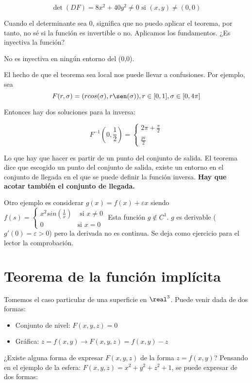 $$\det(DF) = 8x^2 + 40y^2 \neq 0 \text{ si } (x,y) \neq (0,0)$$

Cuando el determinante sea 0, significa que no puedo aplicar el teorema, por tanto, no sé si la función es invertible o no. Aplicamos los fundamentos. ¿Es inyectiva la función?

No es inyectiva en ningún entorno del (0,0).

El hecho de que el teorema sea local nos puede llevar a confusiones. Por ejemplo, sea \[ F (r,\sigma) = (rcos(\sigma),r\sen(\sigma)), r \in [0,1], \sigma \in [0,4\pi]\]

Entonces hay dos soluciones para la inversa:

\[ F^{-1} (0,\frac{1}{2}) = \left\{\begin{matrix}2\pi+\frac{\pi}{2}\\\frac{pi}{2}\end{matrix}\right. \]

Lo que hay que hacer es partir de un punto del conjunto de salida. El teorema dice que escogido un punto del conjunto de salida, existe un entorno en el conjunto de llegada en el que se puede definir la función inversa. \textbf{Hay que acotar también el conjunto de llegada.}

Otro ejemplo es considerar  $g(x) = f(x) + \varepsilon x$ siendo $f(s) =\left\{\begin{matrix}x^2sin\left(\frac{1}{x}\right)& \text{ si } x\neq0\\0 &\text{si } x=0\end{matrix}\right.$
Esta función $g \notin C^1$. $g$ es derivable ($g'(0) = \varepsilon>0$) pero la derivada no es continua. Se deja como ejercicio para el lector la comprobación.

\section{Teorema de la función implícita}

Tomemos el caso particular de una superficie en $\real^3$. Puede venir dada de dos formas:
\begin{itemize}
 \item Conjunto de nivel: $F(x,y,z) = 0$
 \item Gráfica: $z=f(x,y) \rightarrow F(x,y,z) = f(x,y)-z$
\end{itemize}

¿Existe alguna forma de expresar $F(x,y,z)$ de la forma $z=f(x,y)$? Pensando en el ejemplo de la esfera: $F(x,y,z) = x^2+y^2+z^2+1$, se puede expresar de dos formas:

